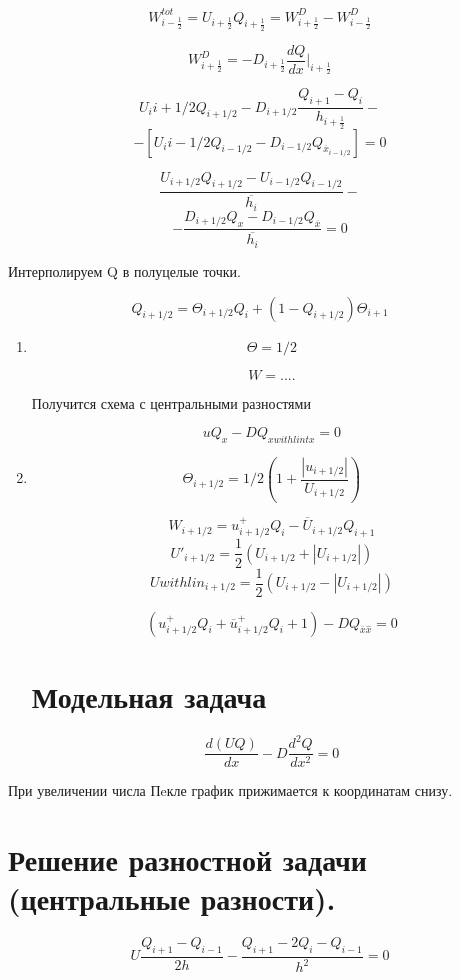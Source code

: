 \documentclass[14pt]{extarticle}
\begin{document}
\[ W^{tot}_{i-\frac{1}{2}} = U_{i+\frac{1}{2}} Q_{i+\frac{1}{2}} = W^D_{i+\frac{1}{2}} - W^D_{i-\frac{1}{2}} \]

\[ W^D_{i+\frac{1}{2}} = - D_{i+\frac{1}{2}} \frac{dQ}{dx}|_{i+\frac{1}{2}} \]

\[ U_i{i+1/2} Q_{i+1/2} - D_{i+1/2}\frac{Q_{i+1} - Q_i}{h_{i+\frac{1}{2}}} -\]
\[ - [U_i{i-1/2} Q_{i-1/2} - D_{i-1/2} Q_{{\overline{x}}_{i-1/2}}]= 0 \]

\[ \frac{U_{i+1/2} Q_{i+1/2}  - U_{i-1/2} Q_{i-1/2}}{\overline{h_i}} -\]
\[-\frac{D_{i+1/2} Q_x - D_{i-1/2} Q_{\overline{x}}}{\overline{h_i}} = 0 \]

Интерполируем Q в полуцелые точки.

\[ Q_{i+1/2} = \Theta_{i+1/2} Q_i + (1-Q_{i+1/2}) \Theta_{i+1} \]

\begin{enumerate}
	\item \[ \Theta = 1/2 \]

	\[ W = .... \]

	Получится схема с центральными разностями

	\[ u Q_x - D Q_{x with lint x} = 0 \]

	\item \[ \Theta_{i+1/2} = 1/2(1+\frac{|u_{i+1/2}|}{U_{i+1/2}}) \]

	\[ W_{i+1/2} = u^+_{i+1/2} Q_i - \overline{U}_{i+1/2} Q_{i+1} \]
	\[ U'_{i+1/2} = \frac{1}{2} (U_{i+1/2} + |U_{i+1/2}|) \]
	\[ U with lin_{i+1/2} = \frac{1}{2} (U_{i+1/2} - |U_{i+1/2}|) \]

	\[ (u^+_{i+1/2} Q_i + \overline{u}^+_{i+1/2} Q_i+1) - D Q_{\overline{x} \widehat{x}} = 0 \]

	\section{Модельная задача}

	\[ \frac{d(UQ)}{dx} - D \frac{d^2Q}{dx^2} = 0 \]

\end{enumerate}

При увеличении числа Пeкле график прижимается к координатам снизу.

\section{Решение разностной задачи (центральные разности).}

\[ U \frac{Q_{i+1} - Q_{i-1}}{2h} - \frac{Q_{i+1} - 2Q_{i} - Q_{i-1}}{h^2} = 0\]
\end{document}
